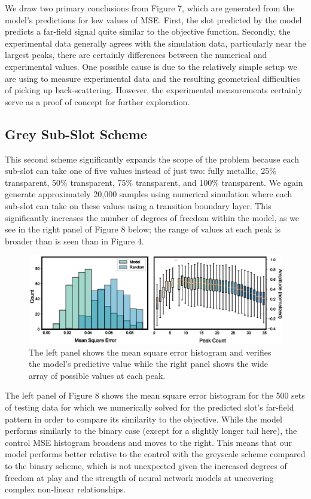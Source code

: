 \documentclass[11pt]{article}
\begin{document}
\noindent We draw two primary conclusions from Figure 7, which are generated from the model's predictions for low values of MSE. First, the slot predicted by the model predicts a far-field signal quite similar to the objective function. Secondly, the experimental data generally agrees with the simulation data, particularly near the largest peaks, there are certainly differences between the numerical and experimental values. One possible cause is due to the relatively simple setup we are using to measure experimental data and the resulting geometrical difficulties of picking up back-scattering. However, the experimental measurements certainly serve as a proof of concept for further exploration.

\subsection*{Grey Sub-Slot Scheme}

\noindent This second scheme significantly expands the scope of the problem because each sub-slot can take one of five values instead of just two: fully metallic, 25\% transparent, 50\% transparent, 75\% transparent, and 100\% transparent. We again generate approximately 20,000 samples using numerical simulation where each sub-slot can take on these values using a transition boundary layer. This significantly increases the number of degrees of freedom within the model, as we see in the right panel of Figure 8 below; the range of values at each peak is broader than is seen than in Figure 4.

\begin{figure}[H]
	\includegraphics[width=6.5in]{figures/histboxgrey.eps}
		\caption{The left panel shows the mean square error histogram and verifies the model's predictive value while the right panel shows the wide array of possible values at each peak.}
\end{figure}

\noindent The left panel of Figure 8 shows the mean square error histogram for the 500 sets of testing data for which we numerically solved for the predicted slot's far-field pattern in order to compare its similarity to the objective. While the model performs similarly to the binary case (except for a slightly longer tail here), the control MSE histogram broadens and moves to the right. This means that our model performs better relative to the control with the greyscale scheme compared to the binary scheme, which is not unexpected given the increased degrees of freedom at play and the strength of neural network models at uncovering complex non-linear relationships.  \\
\end{document}
